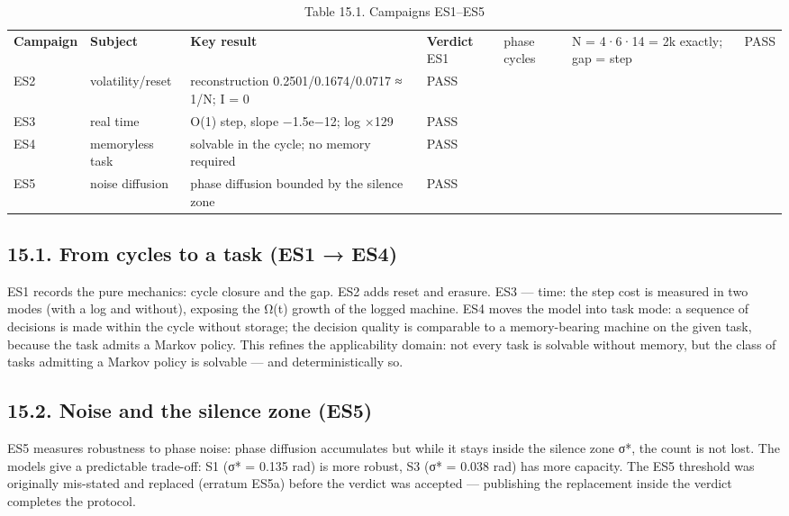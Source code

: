 \documentclass[11pt,a4paper]{article}
\begin{document}
\begin{table}[htbp]\centering\small
\caption{Table 15.1. Campaigns ES1–ES5}
\begin{tabular}{p{} p{} p{} p{}}
\toprule
\textbf{Campaign} & \textbf{Subject} & \textbf{Key result} & \textbf{Verdict}
\midrule
ES1 & phase cycles & N = 4·6·14 = 2k exactly; gap = step & PASS \\
ES2 & volatility/reset & reconstruction 0.2501/0.1674/0.0717 ≈ 1/N; I = 0 & PASS \\
ES3 & real time & O(1) step, slope −1.5e−12; log ×129 & PASS \\
ES4 & memoryless task & solvable in the cycle; no memory required & PASS \\
ES5 & noise diffusion & phase diffusion bounded by the silence zone & PASS \\
\bottomrule
\end{tabular}
\end{table}

\subsection{15.1. From cycles to a task (ES1 → ES4)}

ES1 records the pure mechanics: cycle closure and the gap. ES2 adds reset and erasure. ES3 — time: the step cost is measured in two modes (with a log and without), exposing the Ω(t) growth of the logged machine. ES4 moves the model into task mode: a sequence of decisions is made within the cycle without storage; the decision quality is comparable to a memory-bearing machine on the given task, because the task admits a Markov policy. This refines the applicability domain: not every task is solvable without memory, but the class of tasks admitting a Markov policy is solvable — and deterministically so.

\subsection{15.2. Noise and the silence zone (ES5)}

ES5 measures robustness to phase noise: phase diffusion accumulates but while it stays inside the silence zone σ*, the count is not lost. The models give a predictable trade-off: S1 (σ* = 0.135 rad) is more robust, S3 (σ* = 0.038 rad) has more capacity. The ES5 threshold was originally mis-stated and replaced (erratum ES5a) before the verdict was accepted — publishing the replacement inside the verdict completes the protocol.
\end{document}
